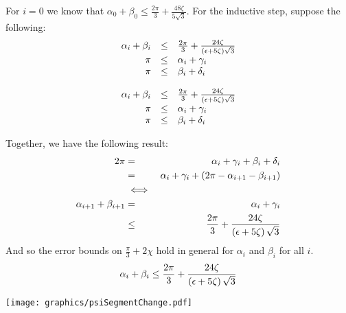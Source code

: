 For $i=0$ we know that $\alpha_0 + \beta_0 \leq \frac{2\pi}{3} + \frac{48 \zeta}{5\sqrt{3}}.$
For the inductive step, suppose the following:
$$
\begin{array}{rcl}
\alpha_i +\beta_i &\leq& \frac{2 \pi}{3} + \frac{24 \zeta}{\left( \epsilon + 5 \zeta \right)\sqrt{3}}\\
\pi &\leq& \alpha_i + \gamma_i \\
\pi &\leq& \beta_i + \delta_i
\end{array}
$$ 

$$
\begin{array}{rcl}
\alpha_i +\beta_i &\leq& \frac{2 \pi}{3} + \frac{24 \zeta}{\left( \epsilon + 5 \zeta \right)\sqrt{3}}\\
\pi &\leq& \alpha_i + \gamma_i \\
\pi &\leq& \beta_i + \delta_i
\end{array}
$$

Together, we have the following result:
\begin{eqnarray*}
2\pi &=& \alpha_i + \gamma_i + \beta_i + \delta_i\\
 &=& \alpha_i + \gamma_i + \left( 2\pi - \alpha_{i+1} - \beta_{i+1} \right)\\
 &\iff&\\
\alpha_{i+1} + \beta_{i+1}&=&\alpha_i + \gamma_i \\
&\leq& \frac{2\pi}{3} + \frac{24 \zeta}{\left( \epsilon + 5 \zeta \right)\sqrt{3}}\\
\end{eqnarray*}
And so the error bounds on $\frac{\pi}{3}+2\chi$ hold in general for $\alpha_i$ and $\beta_i$ for all $i$.  
$$\alpha_i + \beta_i \leq \frac{2\pi}{3} + \frac{24 \zeta}{\left( \epsilon + 5 \zeta \right)\sqrt{3}}$$

\begin{minipage}{\linewidth}
\begin{center}
\texttt{[image: graphics/psiSegmentChange.pdf]}
\label{fig:psiSegmentChange.pdf}
\end{center}
\end{minipage}

